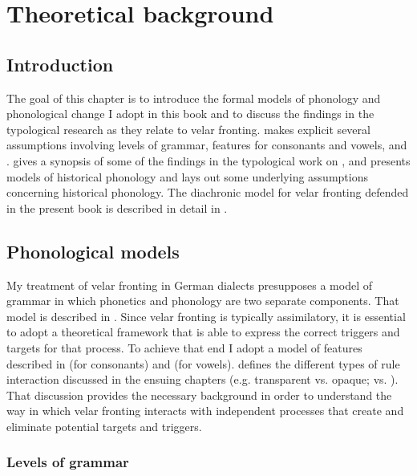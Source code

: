 \chapter{Theoretical background}\label{sec:2}


\section{Introduction}\label{sec:2.1}

The goal of this chapter is to introduce the formal models of phonology and phonological change I adopt in this book and to discuss the findings in the typological research as they relate to velar fronting.  makes explicit several assumptions involving levels of grammar, features for consonants and vowels, and .   gives a synopsis of some of the findings in the typological work on , and  presents models of historical phonology and lays out some underlying assumptions concerning historical phonology. The diachronic model for velar fronting defended in the present book is described in detail in . 

\section{{Phonological} {models}}\label{sec:2.2}

\begin{sloppypar}
My treatment of velar fronting in German dialects presupposes a model of grammar in which phonetics and phonology are two separate components. That model is described in . Since velar fronting is typically assimilatory, it is essential to adopt a theoretical framework that is able to express the correct triggers and targets for that process. To achieve that end I adopt a model of features described in  (for consonants) and  (for vowels).  defines the different types of rule interaction discussed in the ensuing chapters (e.g. transparent vs. opaque;  vs. ). That discussion provides the necessary background in order to understand the way in which velar fronting interacts with independent processes that create and eliminate potential targets and triggers.
\end{sloppypar}

\subsection{Levels of grammar}\label{sec:2.2.1}

